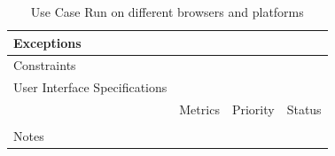 \begin{table}[H]
\begin{tabularx}{\linewidth}{|l|X|X|X|}
            \hline Exceptions                    & \multicolumn{3}{l|}{}                                                                                 \\

            \hline Constraints                   & \multicolumn{3}{l|}{}                                                                                 \\

            \hline User Interface Specifications & \multicolumn{3}{l|}{}                                                                                 \\

            \hline \multirow{2}{*}{}             & Metrics                                                                           & Priority & Status \\
            \cline{2-4}                          &                                                                                   &          &        \\
            \hline Notes                         & \multicolumn{3}{l|}{}                                                                                 \\
            \hline
      \end{tabularx}
      \caption{Use Case Run on different browsers and platforms}
      \label{tab:use_case_multi_platform}
\end{table}

